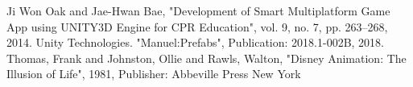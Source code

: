 \documentclass[12pt, a4paper, titlepage]{article}
\begin{document}
\begin{thebibliography}{00}
 Ji Won Oak and Jae-Hwan Bae, "Development of Smart Multiplatform Game App using UNITY3D Engine for CPR Education", vol. 9, no. 7, pp. 263--268, 2014.
 Unity Technologies. "Manuel:Prefabs", Publication: 2018.1-002B, 2018.
 Thomas, Frank and Johnston, Ollie and Rawls, Walton, "Disney Animation: The Illusion of Life", 1981, Publisher: Abbeville Press New York
\end{thebibliography}
\end{document}
